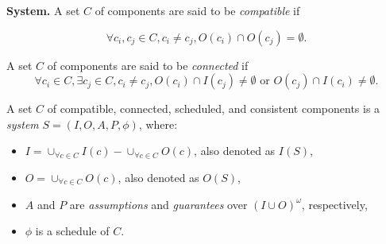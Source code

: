 {\bf System.}
A set $C$ of components are said to be \emph{compatible} if 

\begin{equation*}
\forall c_i,c_j \in C, c_i\neq c_j, O(c_i) \cap O(c_j) = \emptyset.
\end{equation*}

A set $C$ of components are said to be \emph{connected} if
\begin{equation*}
\forall c_i \in C, \exists c_j \in C, c_i\neq c_j, O(c_i) \cap I(c_j) \neq \emptyset \text{ or } O(c_j) \cap I(c_i) \neq \emptyset.
\end{equation*}

A set $C$ of compatible, connected, scheduled, and consistent components is a \emph{system} $S = (I, O, A, P, \phi)$, where:
\begin{itemize}
	\item $I = \cup_{\forall c \in C}I(c) -  \cup_{\forall c \in C}O(c)$, also denoted as $I(S)$,
	\item $O = \cup_{\forall c \in C}O(c)$, also denoted as $O(S)$,
	\item $A$ and $P$ are \emph{assumptions} and \emph{guarantees} over $(I \cup O)^\omega$, respectively,
	\item $\phi$ is a schedule of $C$.	
\end{itemize}